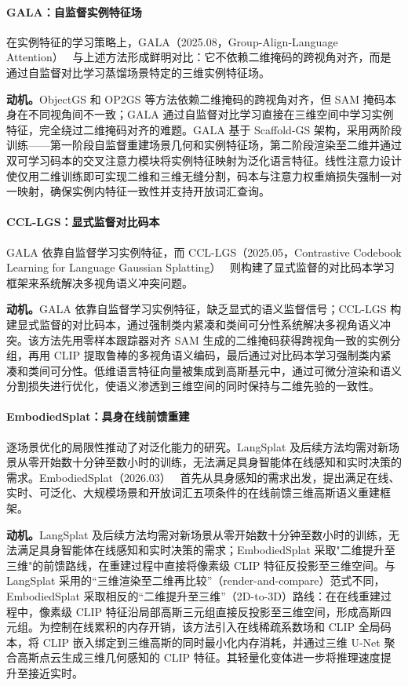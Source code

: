 \paragraph{GALA：自监督实例特征场} 在实例特征的学习策略上，GALA（2025.08，Group-Align-Language Attention）~\cite{2508_14278} 与上述方法形成鲜明对比：它不依赖二维掩码的跨视角对齐，而是通过自监督对比学习蒸馏场景特定的三维实例特征场。

\textbf{动机。}ObjectGS 和 OP2GS 等方法依赖二维掩码的跨视角对齐，但 SAM 掩码本身在不同视角间不一致；GALA 通过自监督对比学习直接在三维空间中学习实例特征，完全绕过二维掩码对齐的难题。GALA 基于 Scaffold-GS 架构，采用两阶段训练——第一阶段自监督重建场景几何和实例特征场，第二阶段渲染至二维并通过双可学习码本的交叉注意力模块将实例特征映射为泛化语言特征。线性注意力设计使仅用二维训练即可实现二维和三维无缝分割，码本与注意力权重熵损失强制一对一映射，确保实例内特征一致性并支持开放词汇查询。

\paragraph{CCL-LGS：显式监督对比码本} GALA 依靠自监督学习实例特征，而 CCL-LGS（2025.05，Contrastive Codebook Learning for Language Gaussian Splatting）~\cite{2505_20469} 则构建了显式监督的对比码本学习框架来系统解决多视角语义冲突问题。

\textbf{动机。}GALA 依靠自监督学习实例特征，缺乏显式的语义监督信号；CCL-LGS 构建显式监督的对比码本，通过强制类内紧凑和类间可分性系统解决多视角语义冲突。该方法先用零样本跟踪器对齐 SAM 生成的二维掩码获得跨视角一致的实例分组，再用 CLIP 提取鲁棒的多视角语义编码，最后通过对比码本学习强制类内紧凑和类间可分性。低维语言特征向量被集成到高斯基元中，通过可微分渲染和语义分割损失进行优化，使语义渗透到三维空间的同时保持与二维先验的一致性。

\paragraph{EmbodiedSplat：具身在线前馈重建}

逐场景优化的局限性推动了对泛化能力的研究。LangSplat 及后续方法均需对新场景从零开始数十分钟至数小时的训练，无法满足具身智能体在线感知和实时决策的需求。EmbodiedSplat（2026.03）~\cite{2603_04254} 首先从具身感知的需求出发，提出满足在线、实时、可泛化、大规模场景和开放词汇五项条件的在线前馈三维高斯语义重建框架。

\textbf{动机。}LangSplat 及后续方法均需对新场景从零开始数十分钟至数小时的训练，无法满足具身智能体在线感知和实时决策的需求；EmbodiedSplat 采取"二维提升至三维"的前馈路线，在重建过程中直接将像素级 CLIP 特征反投影至三维空间。与 LangSplat 采用的``三维渲染至二维再比较''（render-and-compare）范式不同，EmbodiedSplat 采取相反的``二维提升至三维''（2D-to-3D）路线：在在线重建过程中，像素级 CLIP 特征沿局部高斯三元组直接反投影至三维空间，形成高斯四元组。为控制在线累积的内存开销，该方法引入在线稀疏系数场和 CLIP 全局码本，将 CLIP 嵌入绑定到三维高斯的同时最小化内存消耗，并通过三维 U-Net 聚合高斯点云生成三维几何感知的 CLIP 特征。其轻量化变体进一步将推理速度提升至接近实时。

